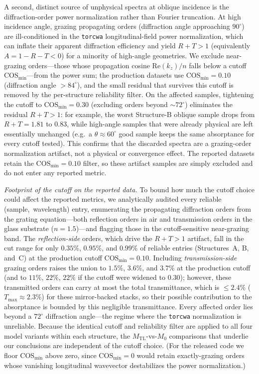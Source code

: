 \documentclass[11pt]{article}
\newcommand{\Mzero}{\ensuremath{M_0}}
\newcommand{\Mtl}{\ensuremath{M_\text{TL}}}
\begin{document}
A second, distinct source of unphysical spectra at oblique incidence is the
diffraction-order power normalization rather than Fourier truncation. At high
incidence angle, grazing propagating orders (diffraction angle approaching
$90^\circ$) are ill-conditioned in the \texttt{torcwa} longitudinal-field power
normalization, which can inflate their apparent diffraction efficiency and yield
$R+T>1$ (equivalently $A=1-R-T<0$) for a minority of high-angle geometries. We
exclude near-grazing orders---those whose propagation cosine $\mathrm{Re}(k_z)/n$
falls below a cutoff $\mathrm{COS}_{\min}$---from the power sum; the production
datasets use $\mathrm{COS}_{\min}=0.10$ (diffraction angle ${>}84^\circ$), and the
small residual that survives this cutoff is removed by the per-structure reliability
filter. On the affected samples, tightening the cutoff to $\mathrm{COS}_{\min}=0.30$
(excluding orders beyond ${\sim}72^\circ$) eliminates the residual $R+T>1$: for
example, the worst Structure-B oblique sample drops from $R+T=1.81$ to $0.83$, while
high-angle samples that were already physical are left essentially unchanged (e.g.\
a $\theta\approx60^\circ$ good sample keeps the same absorptance for every cutoff
tested). This confirms that the discarded spectra are a grazing-order normalization
artifact, not a physical or convergence effect. The reported datasets retain the
$\mathrm{COS}_{\min}=0.10$ filter, so these artifact samples are simply excluded and
do not enter any reported metric.

\emph{Footprint of the cutoff on the reported data.} To bound how much the cutoff
choice could affect the reported metrics, we analytically audited every reliable
(sample,~wavelength) entry, enumerating the propagating diffraction orders from the
grating equation---both reflection orders in air and transmission orders in the glass
substrate ($n{=}1.5$)---and flagging those in the cutoff-sensitive near-grazing band.
The \emph{reflection-side} orders, which drive the $R+T>1$ artifact, fall in the
cut range for only $0.35\%$, $0.95\%$, and $0.99\%$ of reliable entries (Structures~A,
B, and~C) at the production cutoff $\mathrm{COS}_{\min}=0.10$. Including
\emph{transmission-side} grazing orders raises the union to $1.5\%$, $3.6\%$, and
$3.7\%$ at the production cutoff (and to $11\%$, $22\%$, $22\%$ if the cutoff were
widened to $0.30$); however, these transmitted orders can carry at most the total
transmittance, which is $\leq 2.4\%$ ($T_\text{max}\approx2.3\%$) for these
mirror-backed stacks, so their possible contribution to the absorptance is bounded by
this negligible transmittance. Every affected order lies beyond a $72^\circ$
diffraction angle---the regime where the \texttt{torcwa} normalization is unreliable.
Because the identical cutoff and reliability filter are applied to all four model
variants within each structure, the $\Mtl$-vs-$\Mzero$ comparisons that underlie our
conclusions are independent of the cutoff choice. (For the released code we floor
$\mathrm{COS}_{\min}$ above zero, since $\mathrm{COS}_{\min}=0$ would retain
exactly-grazing orders whose vanishing longitudinal wavevector destabilizes the power
normalization.)
\end{document}
